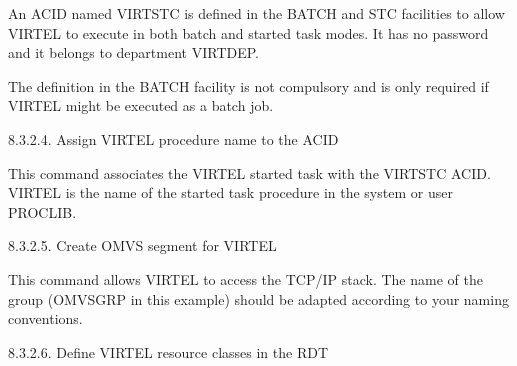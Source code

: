 \documentclass[letterpaper,10pt,english]{sphinxmanual}
\begin{document}
An ACID named VIRTSTC is defined in the BATCH and STC facilities to allow VIRTEL to execute in both batch and started task modes. It has no password and it belongs to department VIRTDEP.

The definition in the BATCH facility is not compulsory and is only required if VIRTEL might be executed as a batch job.

8.3.2.4. Assign VIRTEL procedure name to the ACID

\begin{sphinxVerbatim}[commandchars=\\\{\}]
   
\end{sphinxVerbatim}


This command associates the VIRTEL started task with the VIRTSTC ACID. VIRTEL is the name of the started task procedure in the system or user PROCLIB.

8.3.2.5. Create OMVS segment for VIRTEL

\begin{sphinxVerbatim}[commandchars=\\\{\}]
     
         
\end{sphinxVerbatim}


This command allows VIRTEL to access the TCP/IP stack. The name of the group (OMVSGRP in this example) should be adapted according to your naming conventions.

8.3.2.6. Define VIRTEL resource classes in the RDT

\begin{sphinxVerbatim}[commandchars=\\\{\}]
  
  
\end{sphinxVerbatim}
\end{document}
